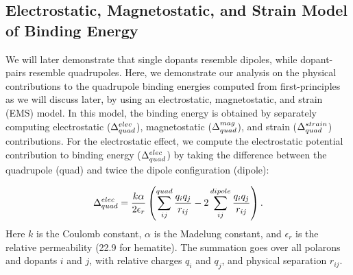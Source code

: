 \subsection{Electrostatic, Magnetostatic, and Strain Model of Binding Energy}
We will later demonstrate that single dopants resemble dipoles, while dopant-pairs resemble quadrupoles. Here, we demonstrate our analysis on the physical contributions to the quadrupole binding energies computed from first-principles as we will discuss later, by using an electrostatic, magnetostatic, and strain (EMS) model.
In this model, the binding energy is obtained by separately computing electrostatic ($\Delta_{quad}^{elec}$), magnetostatic ($\Delta_{quad}^{mag}$), and strain ($\Delta_{quad}^{strain}$) contributions.
For the electrostatic effect, we compute the electrostatic potential contribution to binding energy ($\Delta_{quad}^{elec}$) by taking the difference between the quadrupole
(quad) and twice the dipole configuration (dipole):

\begin{align}
    \Delta_{quad}^{elec} = \frac{k\alpha}{2 \epsilon_r} \left( \sum_{ij}^{quad} \frac{q_i q_j}{r_{ij}} - 2\sum_{ij}^{dipole} \frac{q_i q_j}{r_{ij}} \right).
    \label{eq:be_elec}
\end{align}
Here $k$ is the Coulomb constant, $\alpha$ is the Madelung constant, and $\epsilon_r$ is the relative permeability (22.9 for hematite). \cite{onari1977infrared} The summation goes over all polarons and dopants $i$ and $j$, with relative charges $q_{i}$ and $q_{j}$, and physical separation $r_{ij}$.

